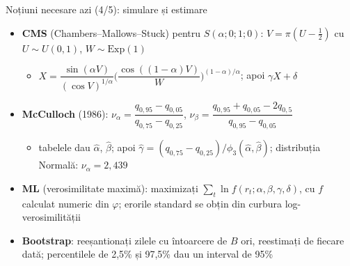 \begin{frame}{Noțiuni necesare azi (4/5): simulare și estimare}
\itemsize{\small}
\begin{itemize}
    \item \textbf{CMS} (Chambers--Mallows--Stuck) pentru $S(\alpha; 0; 1; 0)$: $V = \pi(U - \frac12)$ cu $U \sim U(0, 1)$, $W \sim \mathrm{Exp}(1)$
    \begin{itemize}
        \item $X = \dfrac{\sin(\alpha V)}{(\cos V)^{1/\alpha}}\Big(\dfrac{\cos((1-\alpha)V)}{W}\Big)^{(1-\alpha)/\alpha}$; apoi $\gamma X + \delta$
    \end{itemize}
    \item \textbf{McCulloch} (1986): $\nu_\alpha = \dfrac{q_{0{,}95} - q_{0{,}05}}{q_{0{,}75} - q_{0{,}25}}$, $\nu_\beta = \dfrac{q_{0{,}95} + q_{0{,}05} - 2q_{0{,}5}}{q_{0{,}95} - q_{0{,}05}}$
    \begin{itemize}
        \item tabelele dau $\hat\alpha$, $\hat\beta$; apoi $\hat\gamma = (q_{0{,}75} - q_{0{,}25})/\phi_3(\hat\alpha, \hat\beta)$; distribuția Normală: $\nu_\alpha = 2{,}439$
    \end{itemize}
    \item \textbf{ML} (verosimilitate maximă): maximizați $\sum_t \ln f(r_t; \alpha, \beta, \gamma, \delta)$, cu $f$ calculat numeric din $\varphi$; erorile standard se obțin din curbura log-verosimilității
    \item \textbf{Bootstrap}: reeșantionați zilele cu întoarcere de $B$ ori, reestimați de fiecare dată; percentilele de 2,5\% și 97,5\% dau un interval de 95\%
\end{itemize}
\end{frame}

